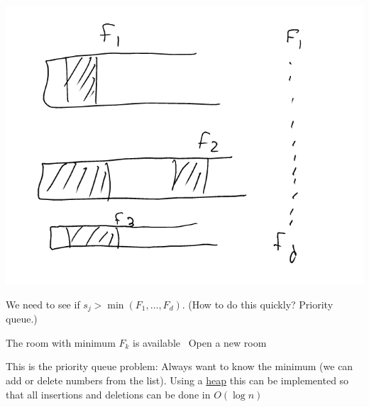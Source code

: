\documentclass[11pt]{article}
\begin{document}
\begin{enumerate}
\begin{center}
\includegraphics[width=.9\linewidth]{./Images/i30.png}
\end{center}
We need to see if \(s_j > \min{(F_1,\ldots,F_d)}\). (How to do this quickly? Priority queue.)
\begin{algorithmic}
   The room with minimum $F_k$ is available
  \Else \ Open a new room
  \EndIf
\end{algorithmic}
This is the priority queue problem: Always want to know the minimum (we can add or delete numbers from the list). Using a \uline{heap} this can be implemented so that all insertions and deletions can be done in \(O(\log n)\)


\end{enumerate}
\end{document}
